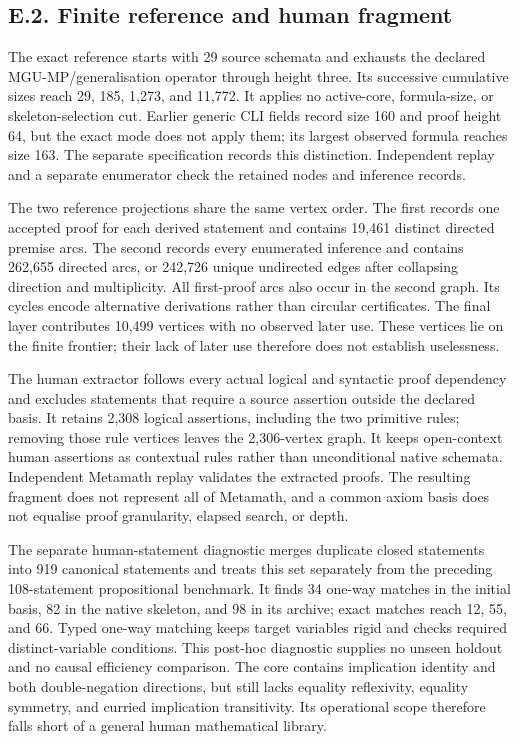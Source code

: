 \documentclass[pdflatex,sn-basic,Numbered]{sn-jnl}
\begin{document}
\subsection*{E.2. Finite reference and human fragment}\label{e.2.-finite-reference-and-human-fragment}

The exact reference starts with 29 source schemata and exhausts the declared MGU-MP/generalisation operator through height three. Its successive cumulative sizes reach 29, 185, 1,273, and 11,772. It applies no active-core, formula-size, or skeleton-selection cut. Earlier generic CLI fields record size 160 and proof height 64, but the exact mode does not apply them; its largest observed formula reaches size 163. The separate specification records this distinction. Independent replay and a separate enumerator check the retained nodes and inference records.

The two reference projections share the same vertex order. The first records one accepted proof for each derived statement and contains 19,461 distinct directed premise arcs. The second records every enumerated inference and contains 262,655 directed arcs, or 242,726 unique undirected edges after collapsing direction and multiplicity. All first-proof arcs also occur in the second graph. Its cycles encode alternative derivations rather than circular certificates. The final layer contributes 10,499 vertices with no observed later use. These vertices lie on the finite frontier; their lack of later use therefore does not establish uselessness.

The human extractor follows every actual logical and syntactic proof dependency and excludes statements that require a source assertion outside the declared basis. It retains 2,308 logical assertions, including the two primitive rules; removing those rule vertices leaves the 2,306-vertex graph. It keeps open-context human assertions as contextual rules rather than unconditional native schemata. Independent Metamath replay validates the extracted proofs. The resulting fragment does not represent all of Metamath, and a common axiom basis does not equalise proof granularity, elapsed search, or depth.

The separate human-statement diagnostic merges duplicate closed statements into 919 canonical statements and treats this set separately from the preceding 108-statement propositional benchmark. It finds 34 one-way matches in the initial basis, 82 in the native skeleton, and 98 in its archive; exact matches reach 12, 55, and 66. Typed one-way matching keeps target variables rigid and checks required distinct-variable conditions. This post-hoc diagnostic supplies no unseen holdout and no causal efficiency comparison. The core contains implication identity and both double-negation directions, but still lacks equality reflexivity, equality symmetry, and curried implication transitivity. Its operational scope therefore falls short of a general human mathematical library.
\end{document}
